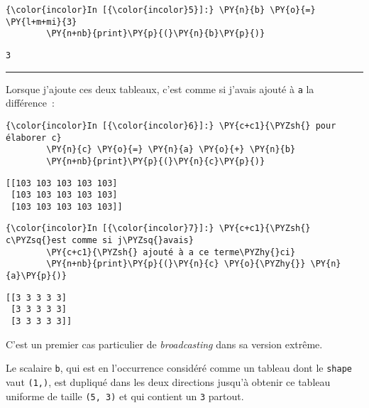     \begin{Verbatim}[commandchars=\\\{\}]
{\color{incolor}In [{\color{incolor}5}]:} \PY{n}{b} \PY{o}{=} \PY{l+m+mi}{3}
        \PY{n+nb}{print}\PY{p}{(}\PY{n}{b}\PY{p}{)}
\end{Verbatim}


    \begin{Verbatim}[commandchars=\\\{\}]
3

    \end{Verbatim}

    \begin{center}\rule{0.5\linewidth}{\linethickness}\end{center}

    Lorsque j'ajoute ces deux tableaux, c'est comme si j'avais ajouté à
\texttt{a} la différence~:

    \begin{Verbatim}[commandchars=\\\{\}]
{\color{incolor}In [{\color{incolor}6}]:} \PY{c+c1}{\PYZsh{} pour élaborer c}
        \PY{n}{c} \PY{o}{=} \PY{n}{a} \PY{o}{+} \PY{n}{b}
        \PY{n+nb}{print}\PY{p}{(}\PY{n}{c}\PY{p}{)}
\end{Verbatim}


    \begin{Verbatim}[commandchars=\\\{\}]
[[103 103 103 103 103]
 [103 103 103 103 103]
 [103 103 103 103 103]]

    \end{Verbatim}

    \begin{Verbatim}[commandchars=\\\{\}]
{\color{incolor}In [{\color{incolor}7}]:} \PY{c+c1}{\PYZsh{} c\PYZsq{}est comme si j\PYZsq{}avais}
        \PY{c+c1}{\PYZsh{} ajouté à a ce terme\PYZhy{}ci}
        \PY{n+nb}{print}\PY{p}{(}\PY{n}{c} \PY{o}{\PYZhy{}} \PY{n}{a}\PY{p}{)}
\end{Verbatim}


    \begin{Verbatim}[commandchars=\\\{\}]
[[3 3 3 3 3]
 [3 3 3 3 3]
 [3 3 3 3 3]]

    \end{Verbatim}

    C'est un premier cas particulier de \emph{broadcasting} dans sa version
extrême.

Le scalaire \texttt{b}, qui est en l'occurrence considéré comme un
tableau dont le \texttt{shape} vaut \texttt{(1,)}, est dupliqué dans les
deux directions jusqu'à obtenir ce tableau uniforme de taille
\texttt{(5,\ 3)} et qui contient un \texttt{3} partout.

